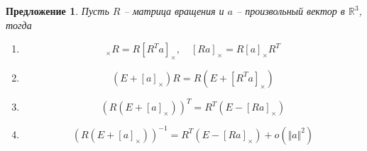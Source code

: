 \documentclass[12pt]{article}
\newtheorem{proposition}[theorem]{Предложение}
\begin{document}
\begin{proposition}
    Пусть $R$ -- матрица вращения и $a$ -- произвольный вектор
    в $\mathbb{R}^3$, тогда
    \begin{enumerate}[label = (\roman*)]
        \item
              \begin{equation}
                  [a]_\times R=R[R^Ta]_\times, \quad [Ra]_\times=R[a]_\times R^T
              \end{equation}
        \item
              \begin{equation}
                  (E+[a]_\times)R=R(E+[R^Ta]_\times)
              \end{equation}
        \item
              \begin{equation}
                  (R(E+[a]_\times))^T=R^T(E-[Ra]_\times)
              \end{equation}
        \item
              $$
                  (R(E+[a]_\times))^{-1}=R^T(E-[Ra]_\times)+o(\Vert a\Vert^2)
              $$
    \end{enumerate}
\end{proposition}
\end{document}
